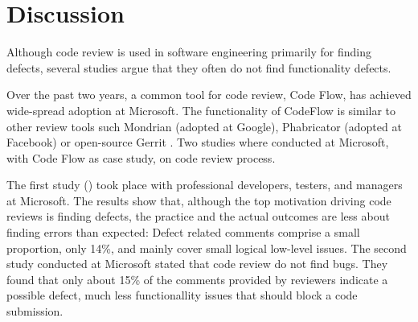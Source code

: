 \documentclass[ifip]{svmult}
\begin{document}
\section{Discussion}
\label{sec:2}


Although code review is used in software engineering primarily for finding defects, several studies argue that they often 
do not find functionality defects.

Over the past two years, a common tool for code review, Code Flow, has achieved wide-spread adoption at Microsoft. 
The functionality of CodeFlow is similar to other review tools such Mondrian \cite{contribution6} (adopted at Google), Phabricator 
\cite{contribution7} (adopted at Facebook) or open-source Gerrit \cite{contribution8}.
Two studies where conducted at Microsoft, with Code Flow as case study, on code review process.

The first study (\cite{contribution9}) took place with professional developers, testers, and managers at Microsoft. 
The results show that, although the top motivation driving code reviews is finding defects, the practice and the 
actual outcomes are less about finding errors than expected: Defect related comments comprise a small proportion, only 14\%, 
and mainly cover small logical low-level issues.
The second study conducted at Microsoft \cite{contribution20} stated that code review do not find bugs. They found that only about 
15\% of the comments provided by reviewers indicate a possible defect, much less functionallity issues that should block a 
code submission. 
\end{document}
